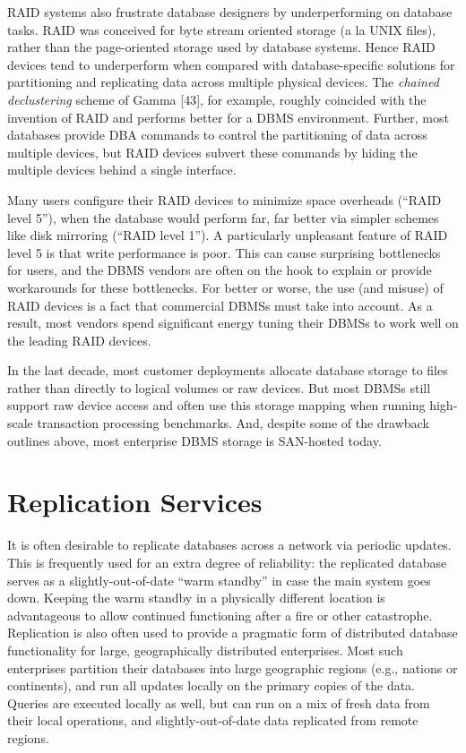 \documentclass[a4paper,11pt,twoside,openright]{book}
\begin{document}
RAID systems also frustrate database designers by underperforming on
database tasks. RAID was conceived for byte stream oriented storage (a
la UNIX files), rather than the page-oriented storage used by database
systems. Hence RAID devices tend to underperform when compared with
database-specific solutions for partitioning and replicating data across
multiple physical devices. The \emph{chained declustering} scheme of
Gamma {[}43{]}, for example, roughly coincided with the invention of
RAID and performs better for a DBMS environment. Further, most databases
provide DBA commands to control the partitioning of data across multiple
devices, but RAID devices subvert these commands by hiding the multiple
devices behind a single interface.

Many users configure their RAID devices to minimize space overheads
(``RAID level 5''), when the database would perform far, far better via
simpler schemes like disk mirroring (``RAID level 1''). A particularly
unpleasant feature of RAID level 5 is that write performance is poor.
This can cause surprising bottlenecks for users, and the DBMS vendors
are often on the hook to explain or provide workarounds for these
bottlenecks. For better or worse, the use (and misuse) of RAID devices
is a fact that commercial DBMSs must take into account. As a result,
most vendors spend significant energy tuning their DBMSs to work well on
the leading RAID devices.

In the last decade, most customer deployments allocate database storage
to files rather than directly to logical volumes or raw devices. But
most DBMSs still support raw device access and often use this storage
mapping when running high-scale transaction processing benchmarks. And,
despite some of the drawback outlines above, most enterprise DBMS
storage is SAN-hosted today.

\hypertarget{replication-services}{%
\section{Replication Services}\label{replication-services}}

It is often desirable to replicate databases across a network via
periodic updates. This is frequently used for an extra degree of
reliability: the replicated database serves as a slightly-out-of-date
``warm standby'' in case the main system goes down. Keeping the warm
standby in a physically different location is advantageous to allow
continued functioning after a fire or other catastrophe. Replication is
also often used to provide a pragmatic form of distributed database
functionality for large, geographically distributed enterprises. Most
such enterprises partition their databases into large geographic regions
(e.g., nations or continents), and run all updates locally on the
primary copies of the data. Queries are executed locally as well, but
can run on a mix of fresh data from their local operations, and
slightly-out-of-date data replicated from remote regions.
\end{document}
